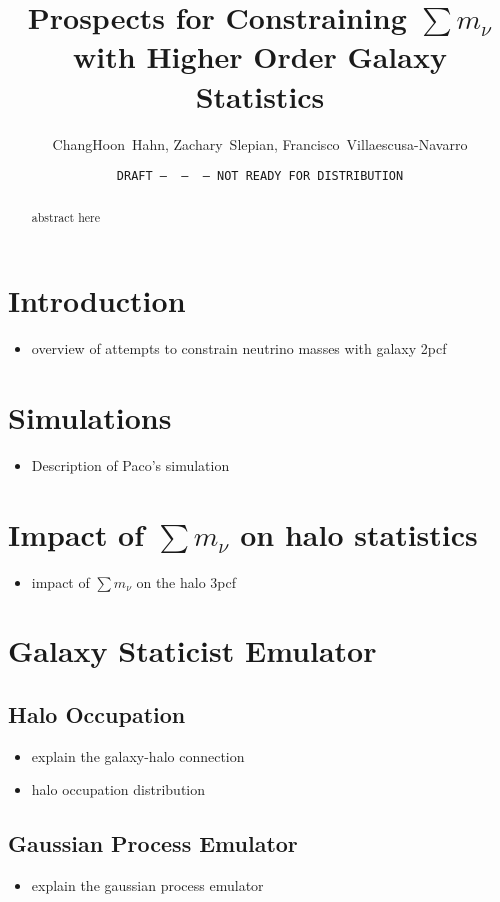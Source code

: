 \documentclass[12pt, letterpaper, preprint]{aastex}
\newcommand{\bitem}{\begin{itemize}}
\newcommand{\eitem}{\end{itemize}}
\begin{document}
\sloppy\sloppypar\frenchspacing 

\title{Prospects for Constraining $\sum m_\nu$ with Higher Order Galaxy Statistics}
\date{\texttt{DRAFT~---~\githash~---~\gitdate~---~NOT READY FOR DISTRIBUTION}}
\author{ChangHoon~Hahn, Zachary~Slepian, Francisco~Villaescusa-Navarro}

\begin{abstract}
    abstract here 
\end{abstract}


\section{Introduction}
\bitem
\item overview of attempts to constrain neutrino masses with galaxy 2pcf
\eitem

\section{Simulations}
\bitem
\item Description of Paco's simulation  
\eitem

\section{Impact of $\sum m_\nu$ on halo statistics}
\bitem
\item impact of $\sum m_\nu$ on the halo 3pcf
\eitem

\section{Galaxy Staticist Emulator}
\subsection{Halo Occupation}
\bitem
\item explain the galaxy-halo connection
\item halo occupation distribution  
\eitem
\subsection{Gaussian Process Emulator}
\bitem
\item explain the gaussian process emulator 
\eitem
\end{document}

